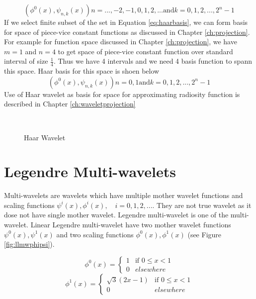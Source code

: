 \begin{equation}\label{eq:haarbasis}
(\phi^0(x),\psi_{n,k}(x)) n=..., -2, -1, 0, 1, 2,... \text{and} k=0,1,2,...,2^n-1
\end{equation}
If we select finite subset of the set in Equation \ref{eq:haarbasis}, we can form basis for space of piece-vice constant functions as discussed in Chapter \ref{ch:projection}. For example for function space discussed in Chapter \ref{ch:projection}, we have $m=1$ and $n=4$ to get space of piece-vice constant function over standard interval of size $\frac{1}{4}$. Thus we have 4 intervals and we need 4 basis function to spann this space. Haar basis for this space is shoen below
\begin{equation}\label{eq:haarbasis_n4}
(\phi^0(x),\psi_{n,k}(x)) n=0, 1 \text{and} k=0,1,2,...,2^n-1
\end{equation}
Use of Haar wavelet as basis for space for approximating radiosity function is described in Chapter \ref{ch:waveletprojection} 



\begin{figure*}
\centering
{}
\\
\caption{Haar Wavelet}
\label{fig:haarphipsi}
\end{figure*}


 

 \section{Legendre Multi-wavelets}
Multi-wavelets are wavelets which have multiple mother wavelet  functions and scaling functions $\psi^i(x), \phi^i(x),\quad i=0,1,2,...$. They are not true wavelet as it dose not have single mother wavelet. Legendre multi-wavelet is one of the multi-wavelet. Linear Legendre multi-wavelet have two mother wavelet functions $\psi^0(x), \psi^1(x)$ and two scaling functions $\phi^0(x), \phi^1(x)$ (see Figure \ref{fig:llmwphipsi}). 

\begin{equation}
\phi^0(x)=
\left\{
    \begin{array}{ll}
        1  & \mbox{if } 0 \leq x < 1 \\
        0 & elsewhere
    \end{array}
\right.
\end{equation}
\begin{equation}
\phi^1(x)=
\left\{
    \begin{array}{ll}
        \sqrt{3}(2x-1)  & \mbox{if } 0 \leq x < 1 \\
        0 & elsewhere
    \end{array}
\right.
\end{equation}

